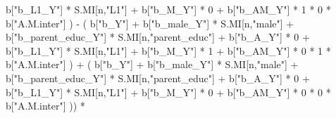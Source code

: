 \documentclass[
]{book}
\newenvironment{Shaded}{\begin{snugshade}}{\end{snugshade}}
\newcommand{\DecValTok}[1]{\textcolor[rgb]{0.00,0.00,0.81}{#1}}
\newcommand{\NormalTok}[1]{#1}
\newcommand{\SpecialCharTok}[1]{\textcolor[rgb]{0.00,0.00,0.00}{#1}}
\newcommand{\StringTok}[1]{\textcolor[rgb]{0.31,0.60,0.02}{#1}}
\begin{document}
\begin{Shaded}
\begin{Highlighting}[]
\NormalTok{                                b[}\StringTok{"b\_L1\_Y"}\NormalTok{] }\SpecialCharTok{*}\NormalTok{ S.MI[n,}\StringTok{"L1"}\NormalTok{] }\SpecialCharTok{+}
\NormalTok{                                b[}\StringTok{"b\_M\_Y"}\NormalTok{] }\SpecialCharTok{*} \DecValTok{0} \SpecialCharTok{+}
\NormalTok{                                b[}\StringTok{"b\_AM\_Y"}\NormalTok{] }\SpecialCharTok{*} \DecValTok{1} \SpecialCharTok{*} \DecValTok{0} \SpecialCharTok{*}\NormalTok{ b[}\StringTok{"A.M.inter"}\NormalTok{] ) }\SpecialCharTok{{-}} 
\NormalTok{                            ( b[}\StringTok{"b\_Y"}\NormalTok{] }\SpecialCharTok{+} 
\NormalTok{                                b[}\StringTok{"b\_male\_Y"}\NormalTok{] }\SpecialCharTok{*}\NormalTok{ S.MI[n,}\StringTok{"male"}\NormalTok{] }\SpecialCharTok{+} 
\NormalTok{                                b[}\StringTok{"b\_parent\_educ\_Y"}\NormalTok{] }\SpecialCharTok{*}\NormalTok{ S.MI[n,}\StringTok{"parent\_educ"}\NormalTok{] }\SpecialCharTok{+} 
\NormalTok{                                b[}\StringTok{"b\_A\_Y"}\NormalTok{] }\SpecialCharTok{*} \DecValTok{0} \SpecialCharTok{+} 
\NormalTok{                                b[}\StringTok{"b\_L1\_Y"}\NormalTok{] }\SpecialCharTok{*}\NormalTok{ S.MI[n,}\StringTok{"L1"}\NormalTok{] }\SpecialCharTok{+}
\NormalTok{                                b[}\StringTok{"b\_M\_Y"}\NormalTok{] }\SpecialCharTok{*} \DecValTok{1} \SpecialCharTok{+}
\NormalTok{                                b[}\StringTok{"b\_AM\_Y"}\NormalTok{] }\SpecialCharTok{*} \DecValTok{0} \SpecialCharTok{*} \DecValTok{1} \SpecialCharTok{*}\NormalTok{ b[}\StringTok{"A.M.inter"}\NormalTok{] ) }\SpecialCharTok{+} 
\NormalTok{                            ( b[}\StringTok{"b\_Y"}\NormalTok{] }\SpecialCharTok{+} 
\NormalTok{                                b[}\StringTok{"b\_male\_Y"}\NormalTok{] }\SpecialCharTok{*}\NormalTok{ S.MI[n,}\StringTok{"male"}\NormalTok{] }\SpecialCharTok{+} 
\NormalTok{                                b[}\StringTok{"b\_parent\_educ\_Y"}\NormalTok{] }\SpecialCharTok{*}\NormalTok{ S.MI[n,}\StringTok{"parent\_educ"}\NormalTok{] }\SpecialCharTok{+} 
\NormalTok{                                b[}\StringTok{"b\_A\_Y"}\NormalTok{] }\SpecialCharTok{*} \DecValTok{0} \SpecialCharTok{+} 
\NormalTok{                                b[}\StringTok{"b\_L1\_Y"}\NormalTok{] }\SpecialCharTok{*}\NormalTok{ S.MI[n,}\StringTok{"L1"}\NormalTok{] }\SpecialCharTok{+}
\NormalTok{                                b[}\StringTok{"b\_M\_Y"}\NormalTok{] }\SpecialCharTok{*} \DecValTok{0} \SpecialCharTok{+}
\NormalTok{                                b[}\StringTok{"b\_AM\_Y"}\NormalTok{] }\SpecialCharTok{*} \DecValTok{0} \SpecialCharTok{*} \DecValTok{0} \SpecialCharTok{*}\NormalTok{ b[}\StringTok{"A.M.inter"}\NormalTok{] )) }\SpecialCharTok{*}

\end{Highlighting}
\end{Shaded}
\end{document}
